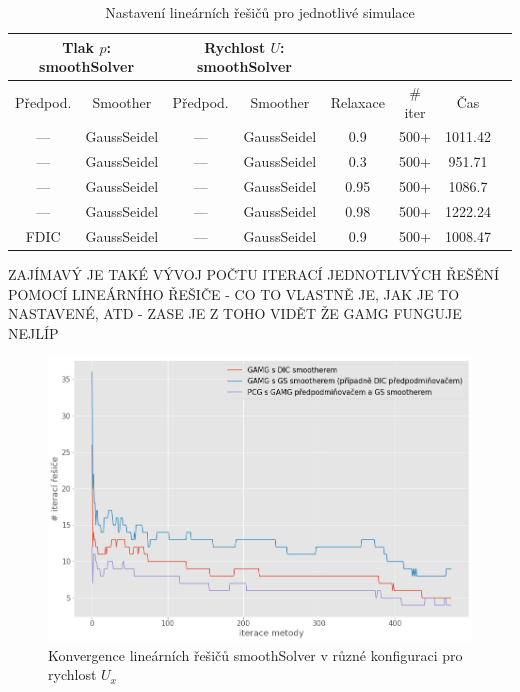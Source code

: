 \documentclass[a4paper,12pt]{report}
\theoremstyle{remark}
\begin{document}
\begin{table}[H]
	\centering
	\caption{Nastavení lineárních řešičů pro jednotlivé simulace}
	\renewcommand{\arraystretch}{1.9}
	\begin{tabular}{*8c}
		\toprule
		\multicolumn{2}{c}{Tlak $p$: \textbf{smoothSolver}} & \multicolumn{2}{c}{Rychlost $U$: \textbf{smoothSolver}}\\
		\midrule
		Předpod.&Smoother&Předpod.&Smoother&Relaxace& \# iter&Čas\\
		\midrule
		--- & GaussSeidel &   --- & GaussSeidel &0.9&500+&1011.42\\
		--- & GaussSeidel &  --- & GaussSeidel &0.3&500+&951.71\\
		--- & GaussSeidel &   --- & GaussSeidel &0.95&500+&1086.7\\
		--- & GaussSeidel &  --- & GaussSeidel &0.98&500+&1222.24\\
		FDIC & GaussSeidel &  --- & GaussSeidel &0.9&500+&1008.47\\
		\bottomrule
	\end{tabular}
	
	\label{table:solvers_set3}
\end{table}

ZAJÍMAVÝ JE TAKÉ VÝVOJ POČTU ITERACÍ JEDNOTLIVÝCH ŘEŠĚNÍ POMOCÍ LINEÁRNÍHO ŘEŠIČE - CO TO VLASTNĚ JE, JAK JE TO NASTAVENÉ, ATD - ZASE JE Z TOHO VIDĚT ŽE GAMG FUNGUJE NEJLÍP

\begin{figure}[H]
	\centering
	\includegraphics[width=1\linewidth]{p-solver-iters-1.png}
	\caption{Konvergence lineárních řešičů smoothSolver v různé konfiguraci pro rychlost $U_x$}
	\label{fig:p-iters-1}
\end{figure}
\end{document}
